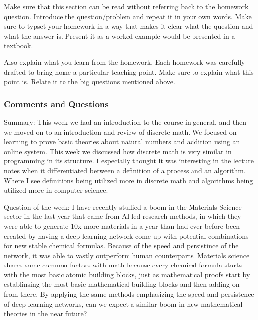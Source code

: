 \documentclass{article}
\theoremstyle{theorem}
\theoremstyle{definition}
\theoremstyle{remark}
\begin{document}
Make sure that this section can be read without referring back to the homework question. Introduce the question/problem and repeat it in your own words. Make sure to typset your homework in a way that makes it clear what  the question and what the answer is. Present it as a worked example would be presented in a textbook. 

Also explain what you learn from the homework. Each homework was carefully drafted to bring home a particular teaching point. Make sure to explain what this point is. Relate it to the big questions mentioned above. 

%
%

\subsubsection*{Comments and Questions}
Summary: This week we had an introduction to the course in general, and then we moved on to an introduction and review of discrete math. We focused on learning to prove basic theories about natural numbers and addition using an online system. This week we discussed how discrete math is very similar in programming in its structure. I especially thought it was interesting in the lecture notes when it differentiated between a definition of a process and an algorithm. Where I see definitions being utilized more in discrete math and algorithms being utilized more in computer science. 

Question of the week: I have recently studied a boom in the Materials Science sector in the last year that came from AI led research methods, in which they were able to generate 10x more materials in a year than had ever before been created by having a deep learning network come up with potential combinations for new stable chemical formulas. Because of the speed and persistince of the network, it was able to vastly outperform human counterparts. Materials science shares some common factors with math because every chemical formula starts with the most basic atomic building blocks, just as mathematical proofs start by establinsing the most basic mathematical building blocks and then adding on from there. By applying the same methods emphasizing the speed and persistence of deep learning networks, can we expect a similar boom in new mathematical theories in the near future?  
\end{document}
